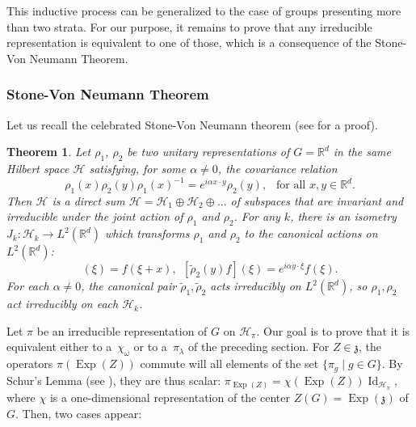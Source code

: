 \documentclass[10pt]{amsart}
\let\mathcal\mathscr
\let\sep\mid
\DeclareMathOperator{\Exp}{Exp}
\DeclareMathOperator{\Id}{Id}
\theoremstyle{plain}
\newtheorem{theorem}{Theorem}[section]
\theoremstyle{definition}
\def\R{{\mathbb R}}
\begin{document}
This inductive process can be generalized to the case of groups presenting more than two strata. For our purpose,
it remains to prove that any irreducible representation is equivalent to one of those, which is a consequence of the Stone-Von Neumann Theorem.

\subsubsection{Stone-Von Neumann Theorem}
Let us recall the celebrated Stone-Von Neumann theorem (see \cite[\S 2.2.9]{CG} for a proof).
\begin{theorem}
Let $\rho_1$, $\rho_2$ be two unitary representations of $G=\R^d$ in the same Hilbert space $\mathcal{H}$ satisfying, for some $\alpha\neq 0$, the covariance relation
\begin{equation*}
\rho_1(x)\rho_2(y)\rho_1(x)^{-1}=e^{i\alpha x\cdot y}\rho_2(y), \ \ \text{ for all $x,y\in\R^d$}.
\end{equation*}
Then $\mathcal{H}$ is a direct sum $\mathcal{H}=\mathcal{H}_1\oplus \mathcal{H}_2\oplus\ldots$ of subspaces that are invariant and irreducible under the joint action of $\rho_1$ and $\rho_2$. For any $k$, there is an isometry $J_k:\mathcal{H}_k\to L^2(\R^d)$ which transforms $\rho_1$ and $\rho_2$ to the canonical actions on $L^2(\R^d)$:
\begin{equation*}
[\widetilde{\rho}_1(x)f](\xi)=f(\xi+x), \ \ [\widetilde{\rho}_2(y)f](\xi)=e^{i\alpha y\cdot \xi}f(\xi).
\end{equation*}
For each $\alpha\neq 0$, the canonical pair $\widetilde{\rho}_1, \widetilde{\rho}_2$ acts irreducibly on $L^2(\R^d)$, so $\rho_1, \rho_2$ act irreducibly on each $\mathcal{H}_k$.
\end{theorem}

Let $\pi$ be an irreducible representation of $G$ on $\mathcal{H}_\pi$. Our goal is to prove that it is equivalent either to a~$\chi_\omega$ or to a~$\pi_\lambda$ of the preceding section. For $Z\in\mathfrak z$, the operators $\pi(\Exp(Z))$ commute will all elements of the set $\{\pi_g \sep g\in G\}$. By Schur's Lemma (see \cite[Lem.\,2.1.1]{CG}), they are thus scalar: $\pi_{\Exp(Z)}=\chi(\Exp(Z))\Id_{\mathcal{H}_\pi}$, where $\chi$ is a one-dimensional representation of the center $Z(G)=\Exp(\mathfrak z)$ of $G$. Then, two cases appear:
\end{document}

